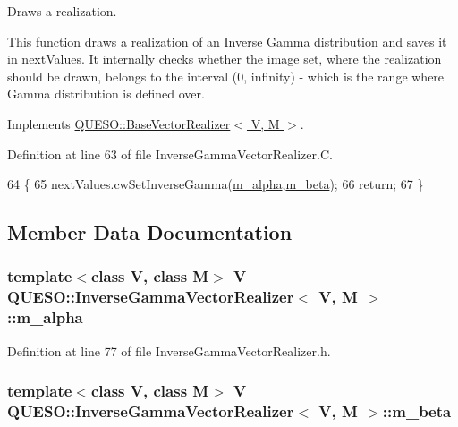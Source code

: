Draws a realization. 

This function draws a realization of an Inverse Gamma distribution and saves it in {\ttfamily next\-Values}. It internally checks whether the image set, where the realization should be drawn, belongs to the interval (0, infinity) -\/ which is the range where Gamma distribution is defined over. 

Implements \hyperlink{class_q_u_e_s_o_1_1_base_vector_realizer_a6845173dd79a80ae11c86cde26e55817}{Q\-U\-E\-S\-O\-::\-Base\-Vector\-Realizer$<$ V, M $>$}.



Definition at line 63 of file Inverse\-Gamma\-Vector\-Realizer.\-C.


\begin{DoxyCode}
64 \{
65   nextValues.cwSetInverseGamma(\hyperlink{class_q_u_e_s_o_1_1_inverse_gamma_vector_realizer_aeb864c46df7833d3723b0df787e283ab}{m\_alpha},\hyperlink{class_q_u_e_s_o_1_1_inverse_gamma_vector_realizer_a23a2409ad76d55ec0734b9755bea7997}{m\_beta});
66   \textcolor{keywordflow}{return};
67 \}
\end{DoxyCode}


\subsection{Member Data Documentation}
\hypertarget{class_q_u_e_s_o_1_1_inverse_gamma_vector_realizer_aeb864c46df7833d3723b0df787e283ab}{
\subsubsection[{m\-\_\-alpha}]{\setlength{\rightskip}{0pt plus 5cm}template$<$class V, class M$>$ V {\bf Q\-U\-E\-S\-O\-::\-Inverse\-Gamma\-Vector\-Realizer}$<$ V, M $>$\-::m\-\_\-alpha\hspace{0.3cm}{\ttfamily [private]}}}\label{class_q_u_e_s_o_1_1_inverse_gamma_vector_realizer_aeb864c46df7833d3723b0df787e283ab}


Definition at line 77 of file Inverse\-Gamma\-Vector\-Realizer.\-h.

\hypertarget{class_q_u_e_s_o_1_1_inverse_gamma_vector_realizer_a23a2409ad76d55ec0734b9755bea7997}{
\subsubsection[{m\-\_\-beta}]{\setlength{\rightskip}{0pt plus 5cm}template$<$class V, class M$>$ V {\bf Q\-U\-E\-S\-O\-::\-Inverse\-Gamma\-Vector\-Realizer}$<$ V, M $>$\-::m\-\_\-beta\hspace{0.3cm}{\ttfamily [private]}}}\label{class_q_u_e_s_o_1_1_inverse_gamma_vector_realizer_a23a2409ad76d55ec0734b9755bea7997}


